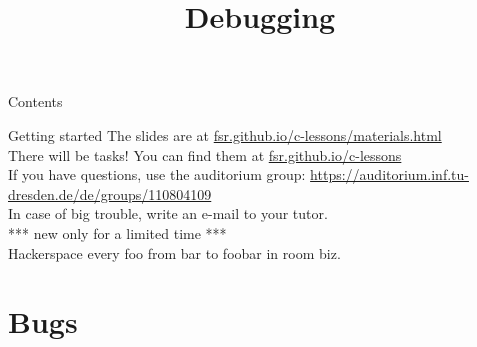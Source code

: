 

\newcommand{\topic}{
	Debugging
}

\hypersetup{
	colorlinks=true,
	linkcolor=blue,
	urlcolor=blue,
}

\title{\topic}
\supertitle{\course}
\date{}



\maketitle

\begin{frame}{Contents}
	\tableofcontents
\end{frame}

\begin{frame}{Getting started}
	The slides are at \href{https://fsr.github.io/c-lessons/materials.html}{fsr.github.io/c-lessons/materials.html}\\
	\bigskip
	There will be tasks! You can find them at \href{http://fsr.github.io/c-lessons/}{fsr.github.io/c-lessons}\\
	\bigskip
	If you have questions, use the auditorium group: \href{https://auditorium.inf.tu-dresden.de/de/groups/110804109}{https://auditorium.inf.tu-dresden.de/de/groups/110804109}\\
	\bigskip
	In case of big trouble, write an e-mail to your tutor.\\
	\bigskip
	\bigskip
	*** new only for a limited time ***\\
	Hackerspace every foo from bar to foobar in room biz.
\end{frame}

\section{Bugs}
